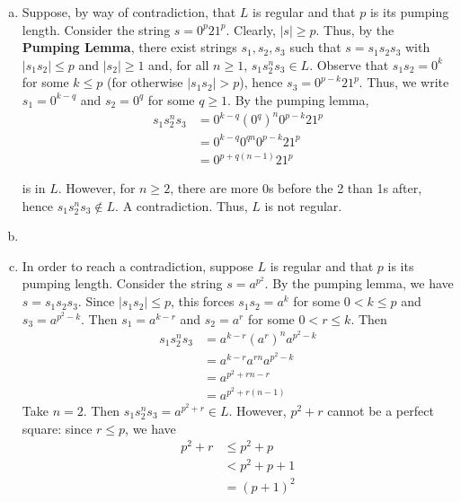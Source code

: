 \begin{solution}\mbox{\\}
\begin{enumerate}[(a)]
    \item Suppose, by way of contradiction, that $L$ is regular and that $p$ is its pumping length. Consider the string $s=0^p21^p$. Clearly, $|s|\geq p$. Thus, by the \textbf{Pumping Lemma}, there exist strings $s_1, s_2, s_3$ such that $s=s_1s_2s_3$ with $|s_1s_2|\leq p$ and $|s_2|\geq1$ and, for all $n\geq 1$, $s_1s_2^ns_3\in L$. Observe that $s_1s_2=0^k$ for some $k\leq p$ (for otherwise $|s_1s_2| > p$), hence $s_3=0^{p-k}21^p$. Thus, we write $s_1=0^{k-q}$ and $s_2=0^{q}$ for some $q\geq1$. By the pumping lemma, 
    \begin{align*}
        s_1s_2^ns_3 &= 0^{k-q}(0^q)^n0^{p-k}21^p\\
                    &= 0^{k-q}0^{qn}0^{p-k}21^p\\
                    &= 0^{p+q(n-1)}21^p
    \end{align*}

    is in $L$. However, for $n\geq2$, there are more 0s before the 2 than 1s after, hence $s_1s_2^ns_3\not\in L$. A contradiction. Thus, $L$ is not regular.

    \item
    \item In order to reach a contradiction, suppose $L$ is regular and that $p$ is its pumping length. Consider the string $s=a^{p^2}$. By the pumping lemma, we have $s=s_1s_2s_3$. Since $|s_1s_2|\leq p$, this forces $s_1s_2=a^k$ for some $0<k\leq p$ and $s_3=a^{p^2-k}$. Then $s_1=a^{k-r}$ and $s_2=a^r$ for some $0<r\leq k$. Then
    \begin{align*}
        s_1s_2^ns_3 &= a^{k-r}(a^r)^na^{p^2-k}\\
                    &= a^{k-r}a^{rn}a^{p^2-k}\\
                    &= a^{p^2+rn-r}\\
                    &= a^{p^2+r(n-1)}
    \end{align*}
    Take $n=2$. Then $s_1s_2^ns_3=a^{p^2+r}\in L$. However, $p^2+r$ cannot be a perfect square: since $r \leq p$, we have 
    \begin{align*}
        p^2+r &\leq p^2 + p\\
              &< p^2 + p + 1\\
              &= (p+1)^2
    \end{align*}
    

\end{enumerate}
\end{solution}
